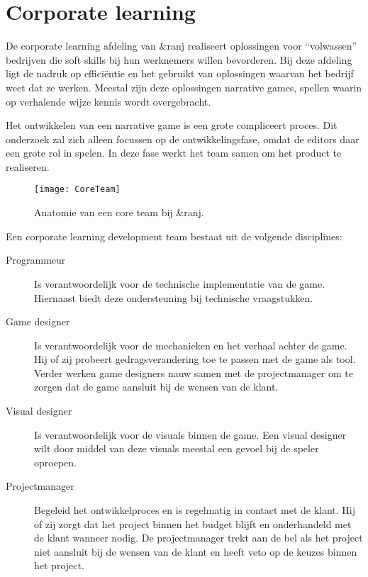 \section{Corporate learning}
De corporate learning afdeling van \&ranj realiseert oplossingen voor “volwassen” bedrijven die soft skills bij hun werknemers willen bevorderen. Bij deze afdeling ligt de nadruk op efficiëntie en het gebruikt van oplossingen waarvan het bedrijf weet dat ze werken. Meestal zijn deze oplossingen narrative games, spellen waarin op verhalende wijze kennis wordt overgebracht.

Het ontwikkelen van een narrative game is een grote compliceert proces. Dit onderzoek zal zich alleen focussen op de ontwikkelingsfase, omdat de editors daar een grote rol in spelen. In deze fase werkt het team samen om het product te realiseren.

\begin{wrapfigure}{r}{0.45\textwidth}
    \texttt{[image: CoreTeam]}
    \caption{Anatomie van een core team bij \&ranj.}
    \label{fig:coreteam}
    \centering
\end{wrapfigure}

Een corporate learning development team bestaat uit de volgende disciplines:

\begin{description}
    \item[Programmeur] Is verantwoordelijk voor de technische implementatie van de game. Hiernaast biedt deze ondersteuning bij technische vraagstukken. 
    \item[Game designer] Is verantwoordelijk voor de mechanieken en het verhaal achter de game. Hij of zij probeert gedragsverandering toe te passen met de game als tool. Verder werken game designers nauw samen met de projectmanager om te zorgen dat de game aansluit bij de wensen van de klant.
    \item[Visual designer] Is verantwoordelijk voor de visuals binnen de game. Een visual designer wilt door middel van deze visuals meestal een gevoel bij de speler oproepen.
    \item[Projectmanager] Begeleid het ontwikkelproces en is regelmatig in contact met de klant. Hij of zij zorgt dat het project binnen het budget blijft en onderhandeld met de klant wanneer nodig. De projectmanager trekt aan de bel als het project niet aansluit bij de wensen van de klant en heeft veto op de keuzes binnen het project.    
\end{description}

